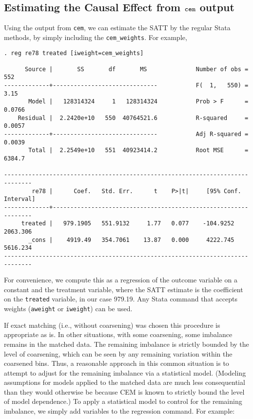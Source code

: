 \documentclass[11pt,titlepage]{article}
\begin{document}
\subsection{Estimating the Causal Effect from $\tt cem$ output}

Using the output from \texttt{cem}, we can estimate the SATT by the
regular Stata methods, by simply including the \texttt{cem\_weights}. For
example, 

\begin{verbatim}
. reg re78 treated [iweight=cem_weights]

      Source |       SS       df       MS              Number of obs =     552
-------------+------------------------------           F(  1,   550) =    3.15
       Model |   128314324     1   128314324           Prob > F      =  0.0766
    Residual |  2.2420e+10   550  40764521.6           R-squared     =  0.0057
-------------+------------------------------           Adj R-squared =  0.0039
       Total |  2.2549e+10   551  40923414.2           Root MSE      =  6384.7

------------------------------------------------------------------------------
        re78 |      Coef.   Std. Err.      t    P>|t|     [95% Conf. Interval]
-------------+----------------------------------------------------------------
     treated |   979.1905   551.9132     1.77   0.077    -104.9252    2063.306
       _cons |    4919.49   354.7061    13.87   0.000     4222.745    5616.234
------------------------------------------------------------------------------

\end{verbatim}

For convenience, we compute this as a regression of the outcome variable
on a constant and the treatment variable, where the SATT estimate is the
coefficient on the \texttt{treated} variable, in our case 979.19.  Any
Stata command that accepts weights (\texttt{aweight} or
\texttt{iweight}) can be used.

If exact matching (i.e., without coarsening) was chosen this procedure is
appropriate as is.  In other situations, with some coarsening, some
imbalance remains in the matched data.  The remaining imbalance is
strictly bounded by the level of coarsening, which can be seen by any
remaining variation within the coarsened bins.  Thus, a reasonable
approach in this common situation is to attempt to adjust for the
remaining imbalance via a statistical model.  (Modeling assumptions for
models applied to the matched data are much less consequential than they
would otherwise be because CEM is known to strictly bound the level of
model dependence.)  To apply a statistical model to control for the
remaining imbalance, we simply add variables to the regression command.
For example:
\end{document}
